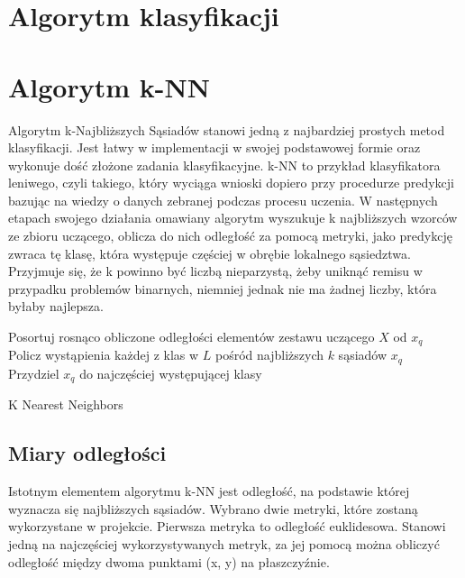 \section{Algorytm klasyfikacji}

\section{Algorytm k-NN}
Algorytm k-Najbliższych Sąsiadów stanowi jedną z najbardziej prostych metod klasyfikacji. Jest łatwy w implementacji w swojej podstawowej formie oraz wykonuje dość złożone zadania klasyfikacyjne. k-NN to przykład klasyfikatora leniwego, czyli takiego, który wyciąga wnioski dopiero przy procedurze predykcji bazując na wiedzy o danych zebranej podczas procesu uczenia. W następnych etapach swojego działania omawiany algorytm wyszukuje k najbliższych wzorców ze zbioru uczącego, oblicza do nich odległość za pomocą metryki, jako predykcję zwraca tę klasę, która występuje częściej w obrębie lokalnego sąsiedztwa. Przyjmuje się, że k powinno być liczbą nieparzystą, żeby uniknąć remisu w przypadku problemów binarnych, niemniej jednak nie ma żadnej liczby, która byłaby najlepsza.

\begin{algorithm}[!ht]
    \label{algorytm}
    \BlankLine
    \SetAlgoVlined

    Posortuj rosnąco obliczone odległości elementów zestawu uczącego $X$ od $x_{q}$ \\
    Policz wystąpienia każdej z klas w $L$ pośród najbliższych $k$ sąsiadów $x_{q}$ \\
    Przydziel $x_{q}$ do najczęściej występującej klasy
    \caption{K Nearest Neighbors}
\end{algorithm}

\subsection{Miary odległości}
Istotnym elementem algorytmu k-NN jest odległość, na podstawie której wyznacza się najbliższych sąsiadów. Wybrano dwie  metryki, które zostaną wykorzystane w projekcie.
Pierwsza metryka to odległość euklidesowa. Stanowi jedną na najczęściej wykorzystywanych metryk, za jej pomocą można obliczyć odległość między dwoma punktami (x, y) na płaszczyźnie.

